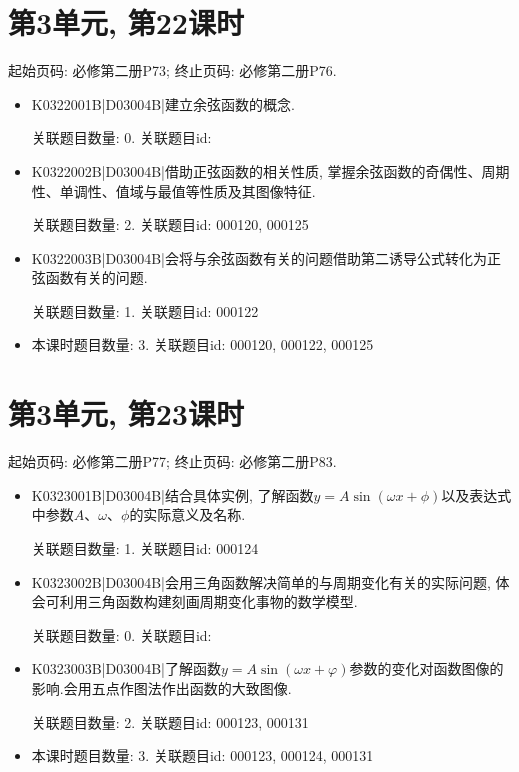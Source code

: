 \section*{第3单元, 第22课时}
起始页码: 必修第二册P73; 终止页码: 必修第二册P76.
\begin{itemize}
\item K0322001B|D03004B|建立余弦函数的概念.

关联题目数量: 0. 关联题目id: 

\item K0322002B|D03004B|借助正弦函数的相关性质, 掌握余弦函数的奇偶性、周期性、单调性、值域与最值等性质及其图像特征.

关联题目数量: 2. 关联题目id: 000120, 000125

\item K0322003B|D03004B|会将与余弦函数有关的问题借助第二诱导公式转化为正弦函数有关的问题.

关联题目数量: 1. 关联题目id: 000122

\item 本课时题目数量: 3. 关联题目id: 000120, 000122, 000125

\end{itemize}

\section*{第3单元, 第23课时}
起始页码: 必修第二册P77; 终止页码: 必修第二册P83.
\begin{itemize}
\item K0323001B|D03004B|结合具体实例, 了解函数$y=A\sin(\omega x+\phi)$以及表达式中参数$A$、$\omega$、$\phi$的实际意义及名称.

关联题目数量: 1. 关联题目id: 000124

\item K0323002B|D03004B|会用三角函数解决简单的与周期变化有关的实际问题, 体会可利用三角函数构建刻画周期变化事物的数学模型.

关联题目数量: 0. 关联题目id: 

\item K0323003B|D03004B|了解函数$y=A\sin(\omega x+\varphi)$参数的变化对函数图像的影响.会用五点作图法作出函数的大致图像.

关联题目数量: 2. 关联题目id: 000123, 000131

\item 本课时题目数量: 3. 关联题目id: 000123, 000124, 000131

\end{itemize}

